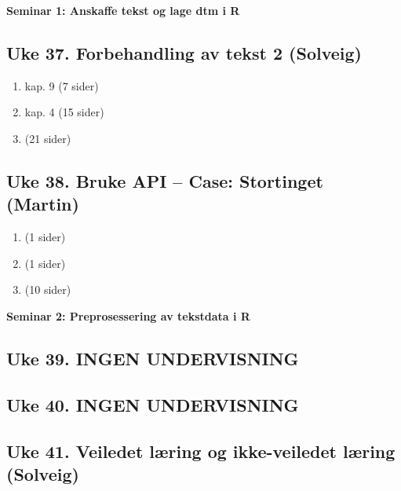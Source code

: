 \documentclass[
]{book}
\providecommand{\tightlist}{%
  \setlength{\itemsep}{0pt}\setlength{\parskip}{0pt}}
\begin{document}
\textbf{Seminar 1: Anskaffe tekst og lage dtm i R}

\hypertarget{uke-37.-forbehandling-av-tekst-2-solveig}{%
\subsection{Uke 37. Forbehandling av tekst 2 (Solveig)}\label{uke-37.-forbehandling-av-tekst-2-solveig}}

\begin{enumerate}
\def\labelenumi{\arabic{enumi}.}
\tightlist
\item
  \citet{Grimmer2022} kap. 9 (7 sider)
\item
  \citet{Silge2017} kap. 4 (15 sider)
\item
  \citet{Denny2018} (21 sider)
\end{enumerate}

\hypertarget{uke-38.-bruke-api-case-stortinget-martin}{%
\subsection{Uke 38. Bruke API -- Case: Stortinget (Martin)}\label{uke-38.-bruke-api-case-stortinget-martin}}

\begin{enumerate}
\def\labelenumi{\arabic{enumi}.}
\tightlist
\item
  \citet{datastortinget2022} (1 sider)
\item
  \citet{Soeyland2022} (1 sider)
\item
  \citet{Finseraas2021} (10 sider)
\end{enumerate}

\textbf{Seminar 2: Preprosessering av tekstdata i R}

\hypertarget{uke-39.-ingen-undervisning}{%
\subsection{Uke 39. INGEN UNDERVISNING}\label{uke-39.-ingen-undervisning}}

\hypertarget{uke-40.-ingen-undervisning}{%
\subsection{Uke 40. INGEN UNDERVISNING}\label{uke-40.-ingen-undervisning}}

\hypertarget{uke-41.-veiledet-luxe6ring-og-ikke-veiledet-luxe6ring-solveig}{%
\subsection{Uke 41. Veiledet læring og ikke-veiledet læring (Solveig)}\label{uke-41.-veiledet-luxe6ring-og-ikke-veiledet-luxe6ring-solveig}}
\end{document}
